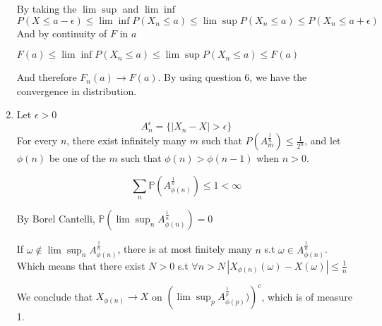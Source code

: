 \documentclass[12pt]{article}
\begin{document}
\begin{enumerate}
By taking the $\lim\sup$ and $\lim\inf$
$ P(X \leq a- \epsilon) \leq \lim\inf P(X_n \leq a)\leq \lim\sup P(X_n \leq a) \leq P(X_n \leq a + \epsilon)$
And by continuity of $F$ in $a$

$ F(a) \leq \lim\inf P(X_n \leq a)\leq \lim\sup P(X_n \leq a) \leq F(a)$

And therefore $F_n(a) \rightarrow F(a)$. By using question 6, we have the convergence in distribution.


\item 

Let $\epsilon > 0$
$$A_n^{\epsilon} = \{|X_n- X| > \epsilon \}$$
For every $n$, there exist infinitely many $m$ such that $P(A_m^{\frac 1 n}) \leq \frac1 {2^n}$, and let $\phi(n)$ be one of the $m$ such that $\phi(n) > \phi(n-1)$ when $n > 0$. 

$$\sum_n \mathbb{P}(A^{\frac1 n}_{\phi(n)}) \leq 1 < \infty$$

By Borel Cantelli, $\mathbb{P}(\lim \sup_n A^{\frac1 n}_{\phi(n)}) = 0$

If $\omega \not \in \lim\sup_n A^{\frac 1 n}_{\phi(n)}$, there is at most finitely many $n$ s.t $\omega \in A^{\frac 1 n}_{\phi(n)}$. Which means that there exist $N > 0$ s.t $\forall n > N \, |X_{\phi(n)}(\omega) - X(\omega)| \leq \frac{1}{n}$


We conclude that $X_{\phi(n)} \rightarrow X$ on $\left(\lim \sup_p A^{\frac 1 p}_{\phi(p)})\right)^c$, which is of measure 1.
\end{enumerate}
\end{document}
